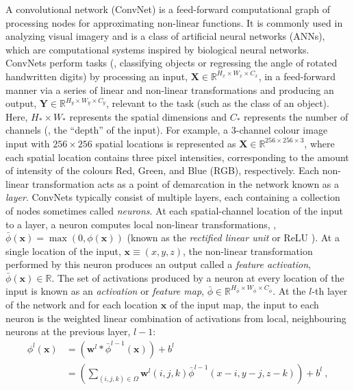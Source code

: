 A convolutional network (ConvNet) is a feed-forward computational graph of processing nodes for approximating non-linear functions. It is commonly used in analyzing visual imagery and is a class of artificial neural networks (ANNs), which are computational systems inspired by biological neural networks. ConvNets perform tasks (\eg, classifying objects or regressing the angle of rotated handwritten digits) by processing an input, $\mathbf{X} \in \mathbb{R}^{H_x \times W_x \times C_x}$, in a feed-forward manner via a series of linear and non-linear transformations and producing an output, $\mathbf{Y} \in \mathbb{R}^{H_y \times W_y \times C_y}$, relevant to the task (such as the class of an object). Here, $H_\ast \times W_\ast$ represents the spatial dimensions and $C_\ast$ represents the number of channels (\ie, the ``depth'' of the input). For example, a $3$-channel colour image input with $256 \times 256$ spatial locations is represented as $\mathbf{X} \in \mathbb{R}^{256 \times 256 \times 3}$, where each spatial location contains three pixel intensities, corresponding to the amount of intensity of the colours Red, Green, and Blue (RGB), respectively. Each non-linear transformation acts as a point of demarcation in the network known as a \emph{layer}. ConvNets typically consist of multiple layers, each containing a collection of nodes sometimes called \emph{neurons}. At each spatial-channel location of the input to a layer, a neuron computes local non-linear transformations, \eg, $\bar{\phi}(\mathbf{x}) = \max{(0, \phi(\mathbf{x}))}$ (known as the \emph{rectified linear unit} or ReLU \cite{nair2010rectified}). At a single location of the input, $\mathbf{x} \equiv (x, y, z)$, the non-linear transformation performed by this neuron produces an output called a \emph{feature activation}, $\bar{\phi}(\mathbf{x}) \in \mathbb{R}$. The set of activations produced by a neuron at every location of the input is known as an \emph{activation} or \emph{feature map}, $\bar{\phi} \in \mathbb{R}^{H_{\bar{\phi}} \times W_{\bar{\phi}} \times C_{\bar{\phi}}}$. At the $l$-th layer of the network and for each location $\mathbf{x}$ of the input map, the input to each neuron is the weighted linear combination of activations from local, neighbouring neurons at the previous layer, $l-1$:
\begin{equation}
	\begin{aligned}
		\phi^l(\mathbf{x}) &= \left(\mathbf{w}^l * \bar{\phi}^{l-1}(\mathbf{x})\right) + b^l\\
		&= \left(\sum_{(i, j, k) \in \Omega} \mathbf{w}^l(i, j, k) \bar{\phi}^{l-1}(x - i, y - j, z - k)\right) + b^l\ ,
	\end{aligned}
\end{equation}
